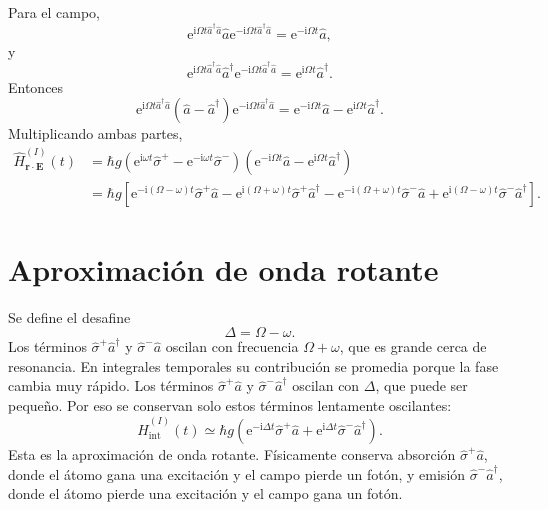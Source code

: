 \documentclass[11pt]{article}
\newcommand{\ii}{\mathrm{i}}
\newcommand{\ee}{\mathrm{e}}
\newcommand{\vb}[1]{\mathbf{#1}}
\newcommand{\adag}{\hat a^\dagger}
\newcommand{\splus}{\hat\sigma^+}
\newcommand{\sminus}{\hat\sigma^-}
\begin{document}
Para el campo,
\begin{equation}
  \ee^{\ii\Omega t\adag\hat a}
  \hat a
  \ee^{-\ii\Omega t\adag\hat a}
  =
  \ee^{-\ii\Omega t}\hat a,
\end{equation}
y
\begin{equation}
  \ee^{\ii\Omega t\adag\hat a}
  \adag
  \ee^{-\ii\Omega t\adag\hat a}
  =
  \ee^{\ii\Omega t}\adag.
\end{equation}
Entonces
\begin{equation}
  \ee^{\ii\Omega t\adag\hat a}
  (\hat a-\adag)
  \ee^{-\ii\Omega t\adag\hat a}
  =
  \ee^{-\ii\Omega t}\hat a
  -
  \ee^{\ii\Omega t}\adag.
\end{equation}
Multiplicando ambas partes,
\begin{align}
  \hat H_{\vb r\cdot\vb E}^{(I)}(t)
  &=
  \hbar g
  \left(
    \ee^{\ii\omega t}\splus
    -
    \ee^{-\ii\omega t}\sminus
  \right)
  \left(
    \ee^{-\ii\Omega t}\hat a
    -
    \ee^{\ii\Omega t}\adag
  \right)                                                                    \\
  &=
  \hbar g
  \left[
    \ee^{-\ii(\Omega-\omega)t}\splus\hat a
    -
    \ee^{\ii(\Omega+\omega)t}\splus\adag
    -
    \ee^{-\ii(\Omega+\omega)t}\sminus\hat a
    +
    \ee^{\ii(\Omega-\omega)t}\sminus\adag
  \right].
\end{align}

\section{Aproximaci\'on de onda rotante}

Se define el desafine
\begin{equation}
  \Delta
  =
  \Omega-\omega.
\end{equation}
Los t\'erminos
\(\splus\adag\) y \(\sminus\hat a\) oscilan con frecuencia
\(\Omega+\omega\), que es grande cerca de resonancia. En integrales temporales
su contribuci\'on se promedia porque la fase cambia muy r\'apido. Los t\'erminos
\(\splus\hat a\) y \(\sminus\adag\) oscilan con \(\Delta\), que puede ser
peque\~no. Por eso se conservan solo estos t\'erminos lentamente oscilantes:
\begin{equation}
  \boxed{
  \hat H_{\mathrm{int}}^{(I)}(t)
  \simeq
  \hbar g
  \left(
    \ee^{-\ii\Delta t}\splus\hat a
    +
    \ee^{\ii\Delta t}\sminus\adag
  \right).
  }
\end{equation}
Esta es la aproximaci\'on de onda rotante. F\'isicamente conserva absorci\'on
\(\splus\hat a\), donde el \'atomo gana una excitaci\'on y el campo pierde un
fot\'on, y emisi\'on \(\sminus\adag\), donde el \'atomo pierde una excitaci\'on
y el campo gana un fot\'on.
\end{document}
